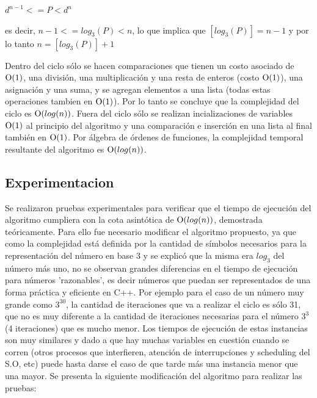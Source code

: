 	\newline
	$d^{n-1} <= P < d^n$

	\newline
	es decir, $n -1 <= log_3(P) < n$, lo que implica que $[log_3(P)] = n - 1$ y por lo tanto $n = [log_3(P)] + 1$


	Dentro del ciclo sólo se hacen comparaciones que tienen un costo asociado de $\operatorname{O}(1)$, una división, una multiplicación y una resta de enteros (costo $\operatorname{O}(1)$), una asignación y una suma, y se agregan elementos a una lista (todas estas operaciones tambien en $\operatorname{O}(1)$). Por lo tanto se concluye que la complejidad del ciclo es $\operatorname{O}(log(n))$. Fuera del ciclo sólo se realizan incializaciones de variables $\operatorname{O}(1)$ al principio del algoritmo y una comparación e inserción en una lista al final también en $\operatorname{O}(1)$. Por álgebra de órdenes de funciones, la complejidad temporal resultante del algoritmo es $\operatorname{O}(log(n))$. 


    \subsection{Experimentacion}
         

	Se realizaron pruebas experimentales para verificar que el tiempo de
	ejecución del algoritmo cumpliera con la cota asintótica de $\operatorname{O}(log(n))$,
	demostrada teóricamente. Para ello fue necesario modificar el algoritmo propuesto, ya que como la complejidad está definida por la cantidad de símbolos necesarios para la representación del número en base 3 y se explicó que la misma era $log_3$ del número más uno, no se observan grandes diferencias en el tiempo de ejecución para números 'razonables', es decir números que puedan ser representados de una forma práctica y eficiente en C++. Por ejemplo para el caso de un número muy grande como $3^{30}$, la cantidad de iteraciones que va a realizar el ciclo es sólo 31, que no es muy diferente a la cantidad de iteraciones necesarias para el número $3^{3}$ (4 iteraciones) que es mucho menor. Los tiempos de ejecución de estas instancias son muy similares y dado a que hay muchas variables en cuestión cuando se corren (otros procesos que interfieren, atención de interrupciones y scheduling del S.O, etc) puede hasta darse el caso de que tarde más una instancia menor que una mayor. Se presenta la siguiente modificación del algoritmo para realizar las pruebas:

